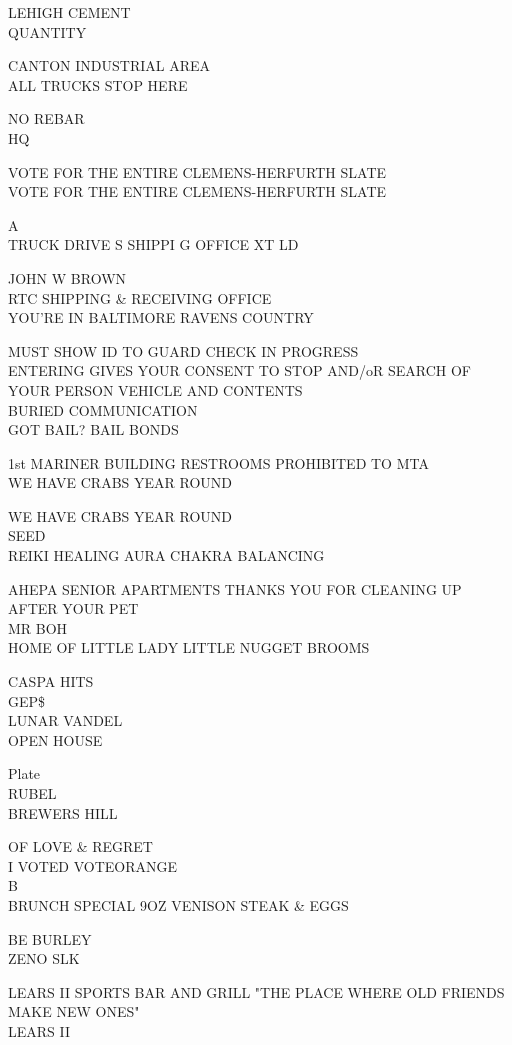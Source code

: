 \documentclass[10pt,letterpaper]{article}
\begin{document}
LEHIGH CEMENT\\
QUANTITY

CANTON INDUSTRIAL AREA\\
ALL TRUCKS STOP HERE

NO REBAR\\
HQ

VOTE FOR THE ENTIRE CLEMENS{-}HERFURTH SLATE\\
VOTE FOR THE ENTIRE CLEMENS{-}HERFURTH SLATE

A\\
TRUCK DRIVE S SHIPPI G OFFICE XT LD

JOHN W BROWN\\
RTC SHIPPING \& RECEIVING OFFICE\\
YOU'RE IN BALTIMORE RAVENS COUNTRY

MUST SHOW ID TO GUARD CHECK IN PROGRESS\\
ENTERING GIVES YOUR CONSENT TO STOP AND/oR SEARCH OF YOUR PERSON VEHICLE AND CONTENTS\\
BURIED COMMUNICATION\\
GOT BAIL?  BAIL BONDS

1st MARINER BUILDING RESTROOMS PROHIBITED TO MTA\\
WE HAVE CRABS YEAR ROUND

WE HAVE CRABS YEAR ROUND\\
SEED\\
REIKI HEALING AURA CHAKRA BALANCING

AHEPA SENIOR APARTMENTS THANKS YOU FOR CLEANING UP AFTER YOUR PET\\
MR BOH\\
HOME OF LITTLE LADY LITTLE NUGGET BROOMS

CASPA HITS\\
GEP\$\\
LUNAR VANDEL\\
OPEN HOUSE

Plate\\
RUBEL\\
BREWERS HILL

OF LOVE \& REGRET\\
I VOTED VOTEORANGE\\
B\\
BRUNCH SPECIAL 9OZ VENISON STEAK \& EGGS

BE BURLEY\\
ZENO SLK

LEARS II SPORTS BAR AND GRILL "THE PLACE WHERE OLD FRIENDS MAKE NEW ONES"\\
LEARS II
\end{document}
